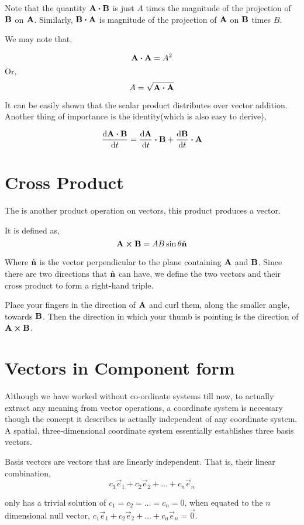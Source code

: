 Note that the quantity \(\Aa \dtp \BB\) is just \(A\) times 
the magnitude of the projection of \(\boldsymbol{\mathbf{B}}\) on \(\boldsymbol{\mathbf{A}}\). Similarly, \(\BB \dtp \Aa\) is
magnitude of the projection of \(\boldsymbol{\mathbf{A}}\) on \(\boldsymbol{\mathbf{B}}\) times \(B\).

We may note that,

\[\Aa \dtp \Aa = A^2\] Or,
\[A = \sqrt{\Aa \dtp \Aa}\]

It can be easily shown that the scalar product distributes over vector addition. 
Another thing of importance is the identity(which is also easy to derive),

\[\dv{\Aa \dtp \BB}{t} = \dv{\Aa}{t} \dtp \BB + \dv{\BB}{t} \dtp \Aa\]

\section{Cross Product}

The  is another product operation on vectors, this product produces a vector.

It is defined as, 
\[\Aa \cp \BB = AB\sin\theta \unitv{n}\] 

Where \(\hat{\boldsymbol{\mathbf{n}}}\) is the vector perpendicular to the plane containing \(\boldsymbol{\mathbf{A}}\) and \(\boldsymbol{\mathbf{B}}\).
Since there are two directions that \(\hat{\boldsymbol{\mathbf{n}}}\) can have, we define the two vectors 
and their cross product to form a right-hand triple.

Place your fingers in the direction of \(\boldsymbol{\mathbf{A}}\) and curl them, along the smaller angle, towards 
\(\boldsymbol{\mathbf{B}}\). Then the direction in which your thumb is pointing is the direction of \(\Aa \cp \BB\). 

\section{Vectors in Component form}

Although we have worked without co-ordinate systems till now,
to actually extract any meaning from vector operations, a coordinate system is necessary
though the concept it describes is actually independent of any coordinate
system.
A spatial, three-dimensional coordinate system essentially establishes
three basis vectors.

Basis vectors are vectors that are linearly independent. That is,
their linear combination, 
\[
    c_1\vec{e}_1 + c_2\vec{e}_2 + \dots + c_n\vec{e}_n\] 

only has a trivial solution of \(c_1 = c_2 = \dots = c_n = 0\), when equated to the \(n\) dimensional null
vector, \(c_1\vec{e}_1 + c_2\vec{e}_2 + \dots + c_n\vec{e}_n = \vec{0}\). 

